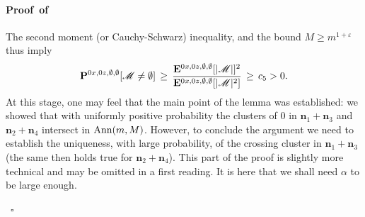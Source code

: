 \documentclass[a4paper,oneside,11pt]{article}
\numberwithin{equation}{section}
\numberwithin{equation}{section}
\numberwithin{equation}{section}
\newenvironment{proof}[1][\relax]%
  {\paragraph{Proof\ifx#1\relax\else~of #1\fi}}%
  {~\hfill$\square$\par\bigskip}
\newcommand{\calM}{\mathcal{M}}
\newcommand{\ep}{\varepsilon}
\newcommand{\n}{\mathbf{n}}
\begin{document}
\begin{proof}
The second moment (or Cauchy-Schwarz) inequality, 
and the bound $M\ge m^{1+\ep}$ thus imply  
\begin{equation} \label{eq:M}
{\bf P}^{0x,0z,\emptyset,\emptyset}[\calM\ne \emptyset]\, \geq \, 
\frac{{\bf E}^{0x,0z,\emptyset,\emptyset}[|\calM|]^2}{{\bf E}^{0x,0z,\emptyset,\emptyset}[|\calM|^2] } \, \geq \,  c_5>0.\end{equation}
At this stage, one may feel that the main point of the lemma was established: we showed that with uniformly positive probability the clusters of 0 in $\n_1+\n_3$ and $\n_2+\n_4$ intersect  in ${\rm Ann}(m,M)$. However,  to conclude the argument we need to establish the uniqueness, with large probability,  of the crossing cluster in $\n_1+\n_3$ (the same then holds true for $\n_2+\n_4$).  
This part of the proof is slightly more technical and may be omitted in a first reading.  
It is here that we shall need $\alpha$ to be large enough.


\end{proof}
\end{document}
